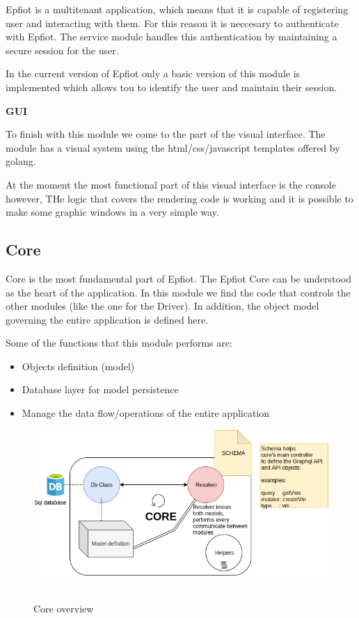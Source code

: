 Epfiot is a multitenant application, which means that it is capable of registering user and interacting with them. For this reason it is neccesary to authenticate with Epfiot. 
The service module handles this authentication by maintaining a secure session for the user.

In the current version of Epfiot only a basic version of this module is implemented which allows tou to identify the user and maintain their session.

\textbf{GUI}

To finish with this module we come to the part of the visual interface. The module has a visual system using the html/css/javascript templates offered by golang.

At the moment the most functional part of this visual interface is the console however, THe logic that covers the rendering code is working and it is possible to make some graphic windows in a very simple way.



\newpage
\subsection{Core}

Core is the most fundamental part of Epfiot. The Epfiot Core can be understood as the heart of the application. In this module we find the code that controls the other modules (like the one for the Driver). In addition, the object model governing the entire application is defined here.

Some of the functions that this module performs are:
\begin{itemize}
    \item Objects definition (model)
    \item Database layer for model persistence
    \item Manage the data flow/operations of the entire application
\end{itemize}

\begin{figure}[h!]%
\centering
    \includegraphics[width=5.5in]{figures/Core.png}
~\caption{Core overview}
\label{figure4.4}
\end{figure}

